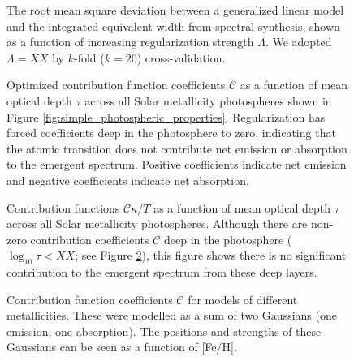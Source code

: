 \documentclass{aastex61}
\begin{document}
\begin{figure}
	\caption{
		The root mean square deviation between a generalized linear model
		and the integrated equivalent width from spectral synthesis,
		shown as a function of increasing regularization strength $\Lambda$.
		We adopted $\Lambda = XX$ by $k$-fold ($k=20$) cross-validation.
		\label{fig:simple_regularization_performance}}
\end{figure}


\begin{figure}
	\caption{
		Optimized contribution function coefficients $\mathcal{C}$ as a 
		function of mean optical depth $\tau$ across all Solar metallicity 
		photospheres shown in Figure \ref{fig:simple_photospheric_properties}.
		Regularization has forced coefficients deep in the photosphere to
		zero, indicating that the atomic transition does not contribute net
		emission or absorption to the emergent spectrum.
		Positive coefficients indicate net emission and negative coefficients
		indicate net absorption.
		\label{fig:simple_photospheric_coefficients}}
\end{figure}


\begin{figure}
	\caption{
		Contribution functions $\mathcal{C}\kappa/T$ as a function of mean
		optical depth $\tau$ across all Solar metallicity photospheres.
		Although there are non-zero contribution coefficients $\mathcal{C}$
		deep in the photosphere ($\log_{10}\tau < XX$; see Figure
		\ref{fig:simple_photospheric_coefficients}), this figure shows
		there is no significant contribution to the emergent spectrum from
		these deep layers.
		\label{fig:simple_photospheric_contributions}}
\end{figure}

			

\begin{figure}
	\caption{
		Contribution function coefficients $\mathcal{C}$ for models
		of different metallicities. These were modelled as a sum of two
		Gaussians (one emission, one absorption). The positions and
		strengths of these Gaussians can be seen as a function of [Fe/H].
		\label{fig:multi_photospheric_coefficients}}
\end{figure}
\end{document}

